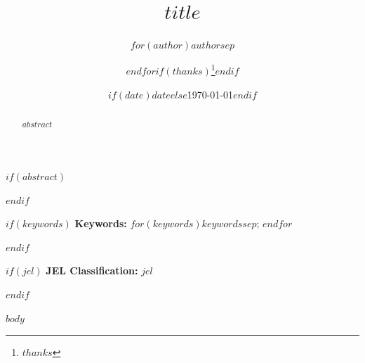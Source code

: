 \documentclass[11pt]{article}
\title{$title$}
\author{$for(author)$$author$$sep$ \and $endfor$$if(thanks)$\footnote{$thanks$}$endif$}
\date{$if(date)$$date$$else$\today$endif$}
\begin{document}
\maketitle

$if(abstract)$
\begin{abstract}
$abstract$
\end{abstract}
$endif$

$if(keywords)$
\noindent\textbf{Keywords:}
$for(keywords)$$keywords$$sep$; $endfor$

\medskip
$endif$

$if(jel)$
\noindent\textbf{JEL Classification:} $jel$

\medskip
$endif$

$body$



\end{document}
